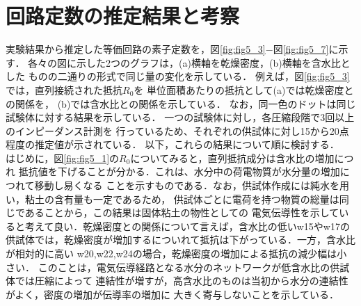 \section{回路定数の推定結果と考察}
実験結果から推定した等価回路の素子定数を，図\ref{fig:fig5_3}−図\ref{fig:fig5_7}に示す．
各々の図に示した2つのグラフは，(a)横軸を乾燥密度，(b)横軸を含水比とした
ものの二通りの形式で同じ量の変化を示している．
例えば，図\ref{fig:fig5_3}では，直列接続された抵抗$R_0$を
単位面積あたりの抵抗として(a)では乾燥密度との関係を，
(b)では含水比との関係を示している．
なお，同一色のドットは同じ試験体に対する結果を示している．
一つの試験体に対し，各圧縮段階で3回以上のインピーダンス計測を
行っているため、それぞれの供試体に対し15から20点程度の推定値が示されている．
以下，これらの結果について順に検討する．\\

はじめに，図\ref{fig:fig5_1}の$R_0$についてみると，直列抵抗成分は含水比の増加につれ
抵抗値を下げることが分かる．これは、水分中の荷電物質が水分量の増加につれて移動し易くなる
ことを示すものである．なお，供試体作成には純水を用い，粘土の含有量も一定であるため，
供試体ごとに電荷を持つ物質の総量は同じであることから，この結果は固体粘土の物性としての
電気伝導性を示していると考えて良い．乾燥密度との関係について言えば，含水比の低いw15やw17の
供試体では，乾燥密度が増加するについれて抵抗は下がっている．一方，含水比が相対的に高い
w20,w22,w24の場合，乾燥密度の増加による抵抗の減少幅は小さい．
このことは，電気伝導経路となる水分のネットワークが低含水比の供試体では圧縮によって
連結性が増すが，高含水比のものは当初から水分の連結性がよく，密度の増加が伝導率の増加に
大きく寄与しないことを示している．\\

